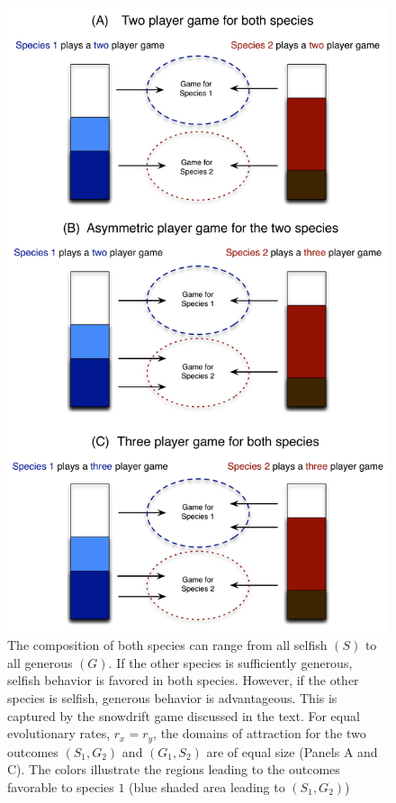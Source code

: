 \documentclass{pnastwo}
\begin{document}
\begin{article}
\begin{figure}[h]
\begin{center}
\includegraphics[width=\columnwidth]{concept.pdf}
\caption{
The composition of both species can range from all selfish $(S)$ to all generous $(G)$. 
If the other species is sufficiently generous, selfish behavior is favored in both species.
However, if the other species is selfish, generous behavior is advantageous.  
This is captured by the snowdrift game discussed in the text.
For equal evolutionary rates, $r_x=r_y$, the domains of attraction for the two outcomes $(S_1, G_2)$ and $(G_1, S_2)$
are of equal size (Panels A and C).
The colors illustrate the regions leading to the outcomes favorable to species $1$ (blue shaded area leading to $(S_1, G_2)$) 
}
\end{center}
\end{figure}
\end{article}
\end{document}
